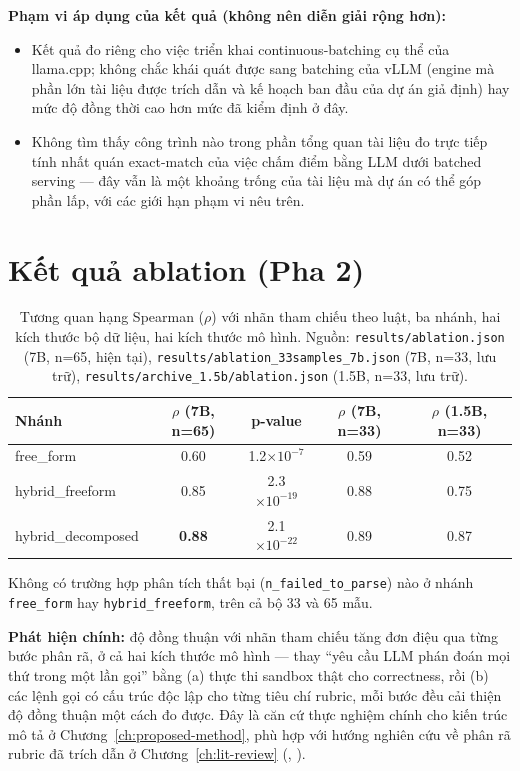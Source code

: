 \documentclass[a4paper,12pt]{report}
\begin{document}
\textbf{Phạm vi áp dụng của kết quả (không nên diễn giải rộng hơn):}
\begin{itemize}
  \item Kết quả đo riêng cho việc triển khai continuous-batching cụ thể của
    llama.cpp; không chắc khái quát được sang batching của vLLM (engine mà
    phần lớn tài liệu được trích dẫn và kế hoạch ban đầu của dự án giả
    định) hay mức độ đồng thời cao hơn mức đã kiểm định ở đây.
  \item Không tìm thấy công trình nào trong phần tổng quan tài liệu đo trực
    tiếp tính nhất quán exact-match của việc chấm điểm bằng LLM dưới
    batched serving — đây vẫn là một khoảng trống của tài liệu mà dự án
    có thể góp phần lấp, với các giới hạn phạm vi nêu trên.
\end{itemize}

\section{Kết quả ablation (Pha 2)}
\label{sec:results-ablation}

\begin{table}[h]
\centering
\begin{tabular}{lcccc}
\toprule
\textbf{Nhánh} & \textbf{$\rho$ (7B, n=65)} & \textbf{p-value} & \textbf{$\rho$ (7B, n=33)} & \textbf{$\rho$ (1.5B, n=33)} \\
\midrule
free\_form & 0.60 & 1.2$\times10^{-7}$ & 0.59 & 0.52 \\
hybrid\_freeform & 0.85 & 2.3$\times10^{-19}$ & 0.88 & 0.75 \\
hybrid\_decomposed & \textbf{0.88} & 2.1$\times10^{-22}$ & 0.89 & 0.87 \\
\bottomrule
\end{tabular}
\caption{Tương quan hạng Spearman ($\rho$) với nhãn tham chiếu theo luật,
ba nhánh, hai kích thước bộ dữ liệu, hai kích thước mô hình. Nguồn:
\texttt{results/ablation.json} (7B, n=65, hiện tại),
\texttt{results/ablation\_33samples\_7b.json} (7B, n=33, lưu trữ),
\texttt{results/archive\_1.5b/ablation.json} (1.5B, n=33, lưu trữ).}
\end{table}

Không có trường hợp phân tích thất bại (\texttt{n\_failed\_to\_parse}) nào
ở nhánh \texttt{free\_form} hay \texttt{hybrid\_freeform}, trên cả bộ 33 và
65 mẫu.

\textbf{Phát hiện chính:} độ đồng thuận với nhãn tham chiếu tăng đơn điệu
qua từng bước phân rã, ở cả hai kích thước mô hình — thay ``yêu cầu LLM
phán đoán mọi thứ trong một lần gọi'' bằng (a) thực thi sandbox thật cho
correctness, rồi (b) các lệnh gọi có cấu trúc độc lập cho từng tiêu chí
rubric, mỗi bước đều cải thiện độ đồng thuận một cách đo được. Đây là căn
cứ thực nghiệm chính cho kiến trúc mô tả ở
Chương~\ref{ch:proposed-method}, phù hợp với hướng nghiên cứu về phân rã
rubric đã trích dẫn ở Chương~\ref{ch:lit-review}
(\cite{rubric_decomposition}, \cite{survey_llm_judge}).
\end{document}
